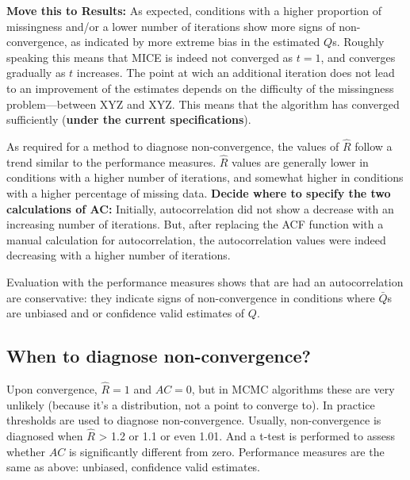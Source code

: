 \documentclass[Royal,times,sageh]{sagej}
\begin{document}
\textbf{Move this to Results:} As expected, conditions with a higher
proportion of missingness and/or a lower number of iterations show more
signs of non-convergence, as indicated by more extreme bias in the
estimated \(Q\)s. Roughly speaking this means that MICE is indeed not
converged as \(t=1\), and converges gradually as \(t\) increases. The
point at wich an additional iteration does not lead to an improvement of
the estimates depends on the difficulty of the missingness
problem---between XYZ and XYZ. This means that the algorithm has
converged sufficiently (\textbf{under the current specifications}).

As required for a method to diagnose non-convergence, the values of
\(\widehat{R}\) follow a trend similar to the performance measures.
\(\widehat{R}\) values are generally lower in conditions with a higher
number of iterations, and somewhat higher in conditions with a higher
percentage of missing data. \textbf{Decide where to specify the two
calculations of AC:} Initially, autocorrelation did not show a decrease
with an increasing number of iterations. But, after replacing the ACF
function with a manual calculation for autocorrelation, the
autocorrelation values were indeed decreasing with a higher number of
iterations.

Evaluation with the performance measures shows that are had an
autocorrelation are conservative: they indicate signs of non-convergence
in conditions where \(\bar{Q}\)s are unbiased and or confidence valid
estimates of \(Q\).

\hypertarget{when-to-diagnose-non-convergence}{%
\subsection{When to diagnose
non-convergence?}\label{when-to-diagnose-non-convergence}}

Upon convergence, \(\widehat{R}=1\) and \(AC=0\), but in MCMC algorithms
these are very unlikely (because it's a distribution, not a point to
converge to). In practice thresholds are used to diagnose
non-convergence. Usually, non-convergence is diagnosed when
\(\widehat{R}\) \textgreater{} 1.2 or 1.1 or even 1.01. And a t-test is
performed to assess whether \(AC\) is significantly different from zero.
Performance measures are the same as above: unbiased, confidence valid
estimates.
\end{document}
